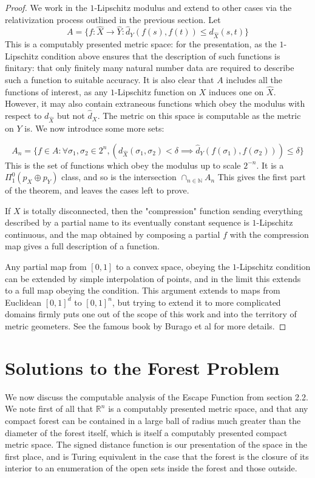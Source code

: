 \documentclass[10pt,a4paper]{article}
\theoremstyle{definition}
\newcommand{\N}{\mathbb{N}}
\def\R{\mathbb{R}}
\begin{document}
\begin{proof}
We work in the $1$-Lipschitz modulus and extend to other cases via the relativization process outlined in the previous section. Let 
$$A = \{f:\hat{X}\rightarrow \hat{Y}:  \hat{d}_{Y}(f(s),f(t)) \leq d_{\hat{X}}(s,t)\} $$
This is a computably presented metric space: for the presentation, as the $1$-Lipschitz condition above ensures that the description of such functions is finitary: that only finitely many natural number data are required to describe such a function to suitable accuracy. It is also clear that $A$ includes all the functions of interest, as any $1$-Lipschitz function on $X$ induces one on $\hat{X}$. However, it may also contain extraneous functions which obey the modulus with respect to $d_{\hat{X}}$ but not $\hat{d}_X$. The metric on this space is computable as the metric on $Y$ is. We now introduce some more sets:

$$A_n = \{f\in A: \forall \sigma_1,\sigma_2\in 2^n, (d_{\hat{X}}(\sigma_1,\sigma_2) < \delta \implies \hat{d}_Y(f(\sigma_1), f(\sigma_2))) \leq\delta\}$$
This is the set of functions which obey the modulus up to scale $2^{-n}$. It is a $\Pi^0_1(p_X\oplus p_Y)$ class, and so is the intersection $\cap_{n\in\N} A_n$ This gives the first part of the theorem, and leaves the cases left to prove.

If $X$ is totally disconnected, then the "compression" function sending everything described by a partial name to its eventually constant sequence is $1$-Lipschitz continuous, and the map obtained by composing a partial $f$ with the compression map gives a full description of a function.

Any partial map from $[0,1]$ to a convex space, obeying the $1$-Lipschitz condition can be extended by simple interpolation of points, and in the limit this extends to a full map obeying the condition. This argument extends to maps from Euclidean $[0,1]^d$ to $[0,1]^n$, but trying to extend it to more complicated domains firmly puts one out of the scope of this work and into the territory of metric geometers. See the famous book by Burago et al \cite{bbi} for more details.
\end{proof}

\section{Solutions to the Forest Problem}
\label{sec:four}
We now discuss the computable analysis of the Escape Function from section 2.2. We note first of all that $\R^n$ is a computably presented metric space, and that any compact forest can be contained in a large ball of radius much greater than the diameter of the forest itself, which is itself a computably presented compact metric space. The signed distance function is our presentation of the space in the first place, and is Turing equivalent in the case that the forest is the closure of its interior to an enumeration of the open sets inside the forest and those outside.
\end{document}
